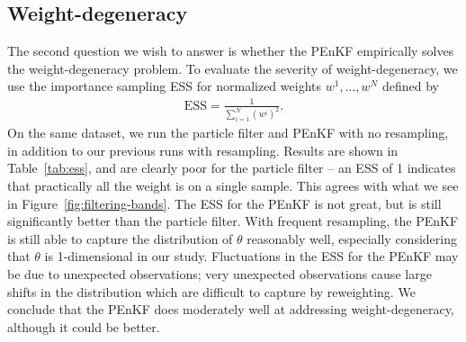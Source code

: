 \documentclass[12pt]{article}
\begin{document}



\subsection{Weight-degeneracy}\label{sec:weight}
The second question we wish to answer is whether the PEnKF empirically solves
the weight-degeneracy problem. To evaluate the severity of weight-degeneracy,
we use the importance sampling ESS for
normalized weights $w^1, \ldots, w^N$ \cite{kong1994,kong1992,chopin2020} defined by
\begin{align}
    \text{ESS} = \frac{1}{\sum_{i=1}^N (w^i)^2}.
\end{align}
On the same dataset, we run the particle filter and PEnKF with no resampling,
in addition to our previous runs with resampling.
Results are shown in Table~\ref{tab:ess}, and are clearly poor for the particle
filter -- an ESS of 1 indicates that practically all the weight is on a single
sample. This agrees with what we see in Figure~\ref{fig:filtering-bands}. The
ESS for the PEnKF is not great, but is still significantly better than the
particle filter. With frequent resampling, the PEnKF is still able to capture
the distribution of $\theta$ reasonably well, especially considering that
$\theta$ is 1-dimensional in our study. Fluctuations in the ESS for the PEnKF
may be due to unexpected observations; very unexpected observations cause large
shifts in the distribution which are difficult to capture by reweighting. We
conclude that the PEnKF does moderately well at addressing weight-degeneracy,
although it could be better.
\end{document}
